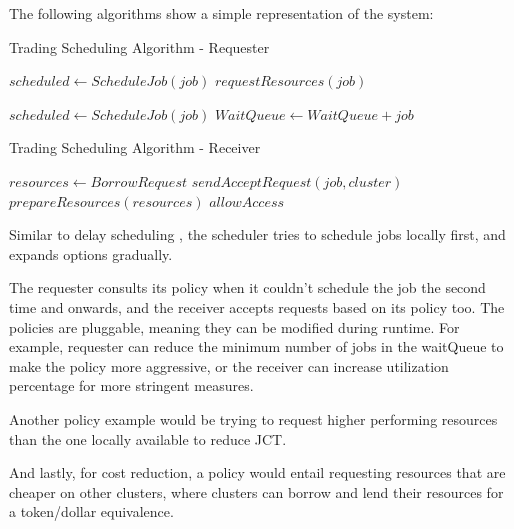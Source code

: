The following algorithms show a simple representation of the system: \label{example}

\begin{algorithm}[H]
\caption{Trading Scheduling Algorithm - Requester}
\begin{algorithmic}
        \State $scheduled \gets ScheduleJob(job)$
          
        \State $requestResources(job)$
        \EndIf
    \EndFor

     
        \State $scheduled \gets ScheduleJob(job)$
        \State $WaitQueue \gets WaitQueue + job$
        \EndIf
    \EndFor
\end{algorithmic}
\end{algorithm}

\begin{algorithm}[H]
    \caption{Trading Scheduling Algorithm - Receiver}
    \begin{algorithmic}
            \State $ resources \gets BorrowRequest $ 
             
            \State $sendAcceptRequest(job, cluster)$
            \State $prepareResources(resources)$
            \State $allowAccess$
            \EndIf
    \end{algorithmic}
\end{algorithm} 

Similar to delay scheduling \cite{zaharia_delay_2010}, the scheduler tries to schedule jobs locally first, and 
expands options gradually. 

The requester consults its policy when it couldn't schedule the job the second time and onwards, and the receiver 
accepts requests based on its policy too. The policies are pluggable, meaning they can be modified during runtime. 
For example, requester can reduce the minimum number of jobs in the waitQueue to make the policy more aggressive, 
or the receiver can increase utilization percentage for more stringent measures.

Another policy example would be trying to request higher performing resources than the one locally available 
to reduce JCT.

And lastly, for cost reduction, a policy would entail requesting resources that are cheaper on other clusters, where 
clusters can borrow and lend their resources for a token/dollar equivalence.